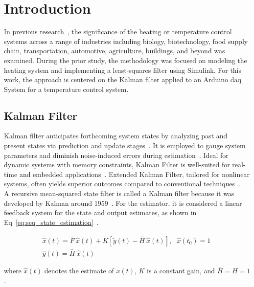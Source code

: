 \section{Introduction}
In previous research~\cite{obregon2024lsf}, the significance of the heating or temperature control systems across a range of industries including biology, biotechnology, food supply chain, transportation, automotive, agriculture, buildings, and beyond was examined. During the prior study, the methodology was focused on modeling the heating system and implementing a least-squares filter using Simulink. For this work, the approach is centered on the Kalman filter applied to an Arduino \acrfull{daq} System for a temperature control system.

\subsection{Kalman Filter}
Kalman filter anticipates forthcoming system states by analyzing past and present states via prediction and update stages~\cite{kalman1960new}. It is employed to gauge system parameters and diminish noise-induced errors during estimation~\cite{bishop2001introduction}. Ideal for dynamic systems with memory constraints, Kalman Filter is well-suited for real-time and embedded applications~\cite{khodarahmi2023review}. Extended Kalman Filter, tailored for nonlinear systems, often yields superior outcomes compared to conventional techniques~\cite{khodarahmi2023review, lai2021novel}. \\

A recursive mean-squared state filter is called a Kalman filter because it was developed
by Kalman around 1959~\cite{mendel1995lessons}. For the estimator, it is considered a linear feedback system for the state and output estimates, as shown in Eq~\ref{eq:seq_state_estimation}~\cite{crassidis2004dynamic}.

\begin{subequations}
\begin{align}
    \dot{\hat{x}}(t) = \bar{F}~\hat{x}(t)+K\left[ \tilde{y}(t) - \bar{H}~\hat{x}(t) \right],~~~\hat{x}(t_{0}) = 1 \\
    \hat{y}(t) = \bar{H}~\hat{x}(t)
\end{align}
~\label{eq:seq_state_estimation}
\end{subequations}

where $\hat{x}(t)$ denotes the estimate of $x(t)$, $K$ is a constant gain, and $\bar{H} = H = 1$. \\

